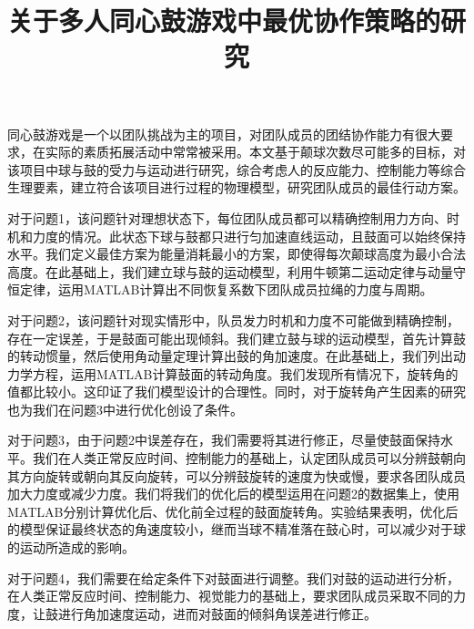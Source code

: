 \documentclass[nocover]{cumcmart}%
\begin{document}
\title{关于多人同心鼓游戏中最优协作策略的研究}


\newcommand{\lhp}[1]{\textcolor{cyan}{lhp: #1}}
\newcommand{\znq}[1]{\textcolor{blue}{znq: #1}}



\maketitle
\begin{cnabstract}%

同心鼓游戏是一个以团队挑战为主的项目，对团队成员的团结协作能力有很大要求，在实际的素质拓展活动中常常被采用。本文基于颠球次数尽可能多的目标，对该项目中球与鼓的受力与运动进行研究，综合考虑人的反应能力、控制能力等综合生理要素，建立符合该项目进行过程的物理模型，研究团队成员的最佳行动方案。

对于问题1，该问题针对理想状态下，每位团队成员都可以精确控制用力方向、时机和力度的情况。此状态下球与鼓都只进行匀加速直线运动，且鼓面可以始终保持水平。我们定义最佳方案为能量消耗最小的方案，即使得每次颠球高度为最小合法高度。在此基础上，我们建立球与鼓的运动模型，利用牛顿第二运动定律与动量守恒定律，运用MATLAB计算出不同恢复系数下团队成员拉绳的力度与周期。

对于问题2，该问题针对现实情形中，队员发力时机和力度不可能做到精确控制，存在一定误差，于是鼓面可能出现倾斜。我们建立鼓与球的运动模型，首先计算鼓的转动惯量，然后使用角动量定理计算出鼓的角加速度。在此基础上，我们列出动力学方程，运用MATLAB计算鼓面的转动角度。我们发现所有情况下，旋转角的值都比较小。这印证了我们模型设计的合理性。同时，对于旋转角产生因素的研究也为我们在问题3中进行优化创设了条件。

对于问题3，由于问题2中误差存在，我们需要将其进行修正，尽量使鼓面保持水平。我们在人类正常反应时间、控制能力的基础上，认定团队成员可以分辨鼓朝向其方向旋转或朝向其反向旋转，可以分辨鼓旋转的速度为快或慢，要求各团队成员加大力度或减少力度。我们将我们的优化后的模型运用在问题2的数据集上，使用MATLAB分别计算优化后、优化前全过程的鼓面旋转角。实验结果表明，优化后的模型保证最终状态的角速度较小，继而当球不精准落在鼓心时，可以减少对于球的运动所造成的影响。

对于问题4，我们需要在给定条件下对鼓面进行调整。我们对鼓的运动进行分析，在人类正常反应时间、控制能力、视觉能力的基础上，要求团队成员采取不同的力度，让鼓进行角加速度运动，进而对鼓面的倾斜角误差进行修正。


\end{cnabstract}
\end{document}
